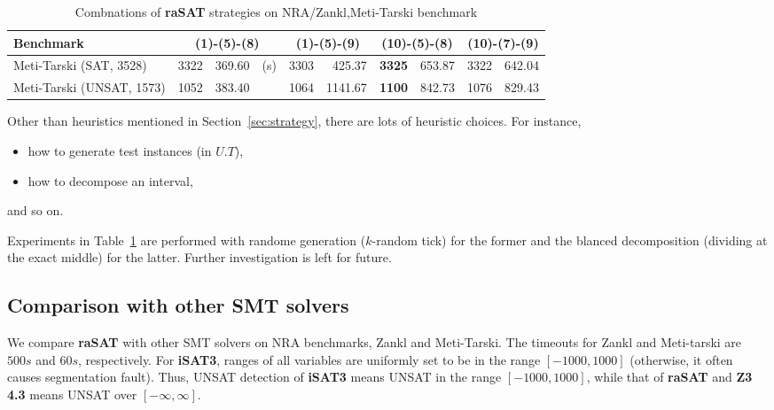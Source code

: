 \documentclass[runningheads,a4paper,oribibl]{llncs}
\begin{document}
\begin{table}[t]
\bigskip

\begin{tabular}{ | l | r | r  r | r  | r | r | r | r | r |}
\hline
    \multicolumn{1}{|l|}{Benchmark} & 
    \multicolumn{3}{c|}{(1)-(5)-(8)} & \multicolumn{2}{c|}{(1)-(5)-(9)} & 
    \multicolumn{2}{c|}{(10)-(5)-(8)} & \multicolumn{2}{c|}{(10)-(7)-(9)} \\
\hline
    Meti-Tarski (SAT, 3528) & 3322 & 369.60 & (s) & 3303 & 425.37 & {\bf 3325} & 653.87 & 3322 & 642.04 
\\
\hline
    Meti-Tarski (UNSAT, 1573) & 1052 & 383.40 && 1064 & 1141.67 & {\bf 1100} & 842.73 & 1076 & 829.43 
\\
\hline
\end{tabular}

\medskip
\caption{Combnations of {\bf raSAT} strategies on NRA/Zankl,Meti-Tarski benchmark} 
\label{tab:rasat-experiments}
\end{table}

Other than heuristics mentioned in Section~\ref{sec:strategy}, 
there are lots of heuristic choices. 
For instance, 
\begin{itemize}
\item how to generate test instances (in $U.T$), 
\item how to decompose an interval, 
\end{itemize} 
and so on. 

Experiments in Table~\ref{tab:rasat-experiments} are performed 
with randome generation ($k$-random tick) for the former and the blanced decomposition 
(dividing at the exact middle) for the latter. 
Further investigation is left for future. 


\subsection{Comparison with other SMT solvers}

We compare {\bf raSAT} with other SMT solvers on NRA benchmarks, Zankl and Meti-Tarski. 
The timeouts for Zankl and Meti-tarski are $500s$ and $60s$, respectively. 
For {\bf iSAT3}, ranges of all variables are uniformly set to be in the range $[-1000, 1000]$
(otherwise, it often causes segmentation fault). 
Thus, UNSAT detection of {\bf iSAT3} means UNSAT in the range $[-1000, 1000]$, 
while that of {\bf raSAT} and {\bf Z3 4.3} means  UNSAT over $[-\infty, \infty]$. 
\end{document}
